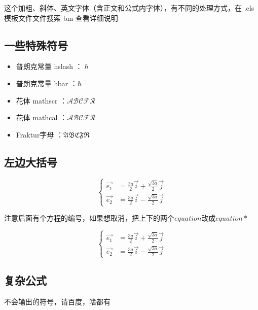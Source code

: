 \documentclass[AutoFakeBold]{LZUThesis}
\begin{document}
这个加粗、斜体、英文字体（含正文和公式内字体），有不同的处理方式，在 .cls 模板文件文件搜索 bm 查看详细说明

\subsection{一些特殊符号}

\begin{itemize}
    \item 普朗克常量 hslash ：$\hslash$
    \item 普朗克常量 hbar ：$\hbar$
    \item 花体 mathscr ：$\mathscr{ABCFR}$
    \item 花体 mathcal ：$\mathcal{ABCFR}$
    \item Fraktur字母 ：$\mathfrak{ABCFR}$
\end{itemize}




\subsection{左边大括号} %
\label{sub:左边大括号}

\begin{equation}
    \left\{
    \begin{array}{rcl}
        \vec{e_1} & = \frac{3a}{2} \vec{i} + \frac{\sqrt{3a}}{2} \vec{j} \\
        \vec{e_2} & = \frac{3a}{2} \vec{i} - \frac{\sqrt{3a}}{2} \vec{j}
    \end{array}
    \right.
    \label{e1e2}
\end{equation}

注意后面有个方程的编号，如果想取消，把上下的两个$equation$改成$equation*$

\begin{equation*}
    \left\{
    \begin{array}{rcl}
        \vec{e_1} & = \frac{3a}{2} \vec{i} + \frac{\sqrt{3a}}{2} \vec{j} \\
        \vec{e_2} & = \frac{3a}{2} \vec{i} - \frac{\sqrt{3a}}{2} \vec{j}
    \end{array}
    \right.
    \label{e1e2_2}
\end{equation*}


\subsection{复杂公式} %
\label{sub:复杂公式}
不会输出的符号，请百度，啥都有
\end{document}
